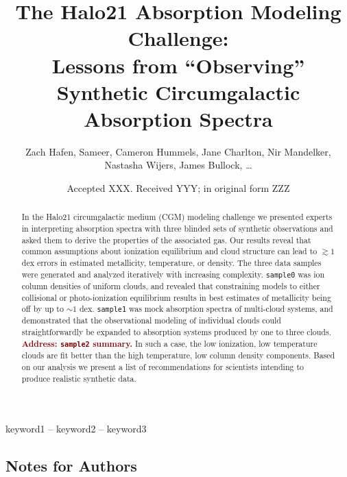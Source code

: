 \documentclass[fleqn,usenatbib]{mnras}
\title[``Observing'' Synthetic Circumgalactic Absorption Spectra]{The Halo21 Absorption Modeling Challenge:\\Lessons from ``Observing'' Synthetic Circumgalactic Absorption Spectra}
\author[]{
Zach Hafen,
Sameer,
Cameron Hummels,
Jane Charlton,
Nir Mandelker,
Nastasha Wijers,
James Bullock,
\ldots
\\
}
\date{Accepted XXX. Received YYY; in original form ZZZ}
\newcommand{\todo}[1]{\textcolor{Maroon}{\textbf{Address: #1}}}
\begin{document}
\label{firstpage}
\pagerange{\pageref{firstpage}--\pageref{lastpage}}
\maketitle

\begin{abstract}
In the Halo21 circumgalactic medium (CGM) modeling challenge we presented experts in interpreting absorption spectra with three blinded sets of synthetic observations and asked them to derive the properties of the associated gas.
Our results reveal that common assumptions about ionization equilibrium and cloud structure can lead to $\gtrsim 1$ dex errors in estimated metallicity, temperature, or density.
The three data samples were generated and analyzed iteratively with increasing complexity.
\texttt{sample0} was ion column densities of uniform clouds, and revealed that constraining models to either collisional or photo-ionization equilibrium results in best estimates of metallicity being off by up to $\sim 1$ dex.
\texttt{sample1} was mock absorption spectra of multi-cloud systems, and demonstrated that the observational modeling of individual clouds could straightforwardly be expanded to absorption systems produced by one to three clouds.
\todo{\texttt{sample2} summary.}
In such a case, the low ionization, low temperature clouds are fit better than the high temperature, low column density components.
Based on our analysis we present a list of recommendations for scientists intending to produce realistic synthetic data.
\end{abstract}

\begin{keywords}
keyword1 -- keyword2 -- keyword3
\end{keywords}



\subsection{Notes for Authors}
\end{document}
